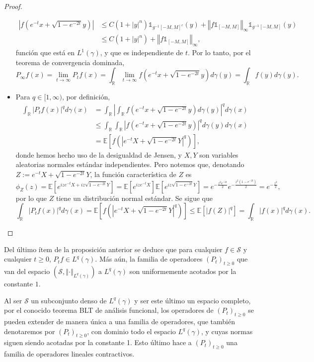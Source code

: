 \documentclass[letterpaper,twoside,12pt]{book}
\newcommand{\R}{\mathbb{R}}
\renewcommand{\S}{\mathcal{S}}
\newcommand{\E}{\mathbb{E}}
\newcommand{\1}{\mathds{1}}
\newcommand{\abs}[1]{\left\lvert #1 \right\rvert}
\renewcommand{\to}{\rightarrow}
\newcommand{\norm}[1]{\left\Vert #1 \right\Vert}
\theoremstyle{definition}
\theoremstyle{definition}
\theoremstyle{definition}
\theoremstyle{definition}
\theoremstyle{definition}
\theoremstyle{definition}
\theoremstyle{definition}
\begin{document}
\begin{proof}
\begin{itemize}
     \begin{align*}
        \abs{f\left(e^{-t}x+\sqrt{1-e^{-2t}}y\right)}&\leq C(1+|y|^n)\1_{g^{-1}[-M,M]^{c}}(y)+\norm{f\1_{[-M,M]}}_\infty\1_{g^{-1}[-M,M]}(y)\\
        &\leq C(1+|y|^n)+\norm{f\1_{[-M,M]}}_\infty,
     \end{align*}
     función que está en $L^1(\gamma)$, y que es independiente de $t$. Por lo tanto, por el teorema de convergencia dominada, 
     \[
     P_\infty f(x)=\lim_{t\to\infty}P_tf(x)=\int_\R\lim_{t\to\infty}f\left(e^{-t}x+\sqrt{1-e^{-2t}}y\right)d\gamma(y)=\int_\R f(y)d\gamma(y).
     \]
     \item Para $q\in [1,\infty)$, por definición,
     \begin{align*}
        \int_\R |P_tf(x)|^q d\gamma(x)&=\int_\R \abs{\int_\R f\left(e^{-t}x+\sqrt{1-e^{-2t}}y\right)d\gamma(y)}^qd\gamma(x)\\
        &\leq \int_\R \int_\R \abs{f\left(e^{-t}x+\sqrt{1-e^{-2t}}y\right)}^qd\gamma(y)d\gamma(x)\\
        &=\E\left[f\left(\abs{e^{-t}X+\sqrt{1-e^{-2t}}Y}^q \right)\right],
     \end{align*}
     donde hemos hecho uso de la desigualdad de Jensen, y $X,Y$ son variables aleatorias normales estándar independientes. Pero notemos que, denotando $Z:= e^{-t}X+\sqrt{1-e^{-2t}}Y$, la función característica de $Z$ es
     \[
     \phi_Z(z)=\E\left[e^{ize^{-t}X+iz\sqrt{1-e^{-2t}}Y}\right]=\E\left[e^{ize^{-t}X}\right]\E\left[e^{iz\sqrt{1-e^{-2t}}Y}\right]=e^{-\frac{z^2e^{-2t}}{2}}e^{-\frac{z^2(1-e^{-2t})}{2}}=e^{-\frac{z^2}{2}},
     \]  
     por lo que $Z$ tiene un distribución normal estándar. Se sigue que 
     \[
        \int_\R |P_tf(x)|^q d\gamma(x)=\E\left[f\left(\abs{e^{-t}X+\sqrt{1-e^{-2t}}Y}^q\right)\right]\leq\E\left[\abs{f(Z)}^q\right]=\int_\R \abs{f(x)}^qd\gamma(x).
     \]
   \end{itemize}
 \end{proof}
 Del último ítem de la proposición anterior se deduce que para cualquier $f\in \S$ y cualquier $t\geq0$, $P_tf\in L^q(\gamma)$. Más aún, la familia de operadores $(P_t)_{t\geq0}$ que van del espacio $(\S,\norm{\cdot}_{L^q(\gamma)})$ a $L^q(\gamma)$ son uniformemente acotados por la constante $1$.
 
 Al ser $\S$ un subconjunto denso de $L^q(\gamma)$ y ser este último un espacio completo, por el conocido teorema BLT de análisis funcional, los operadores de $(P_t)_{t\geq0}$ se pueden extender de manera única a una familia de operadores, que también denotaremos por $(P_t)_{t\geq0}$, con dominio todo el espacio $L^q(\gamma)$, y cuyas normas siguen siendo acotadas por la constante 1. Esto último hace a $(P_t)_{t\geq0}$ una familia de operadores lineales contractivos.
\end{document}
